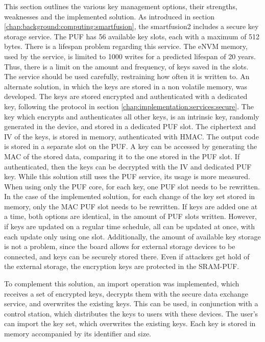 This section outlines the various key management options, their strengths, weaknesses and the implemented solution. 
As introduced in section \ref{chap:background:computing:smartfusion}, the smartfusion2 includes a secure key storage service. The PUF has 56 available key slots, each with a maximum of 512 bytes. There is a lifespan problem regarding this service. The eNVM memory, used by the service, is limited to 1000 writes for a predicted lifespan of 20 years. Thus, there is a limit on the amount and frequency, of keys saved in the slots. The service should be used carefully, restraining how often it is written to.
An alternate solution, in which the keys are stored in a non volatile memory, was developed. The keys are stored encrypted and authenticated with a dedicated key, following the protocol in section \ref{chap:implementation:services:secure}.
The key which encrypts and authenticates all other keys, is an intrinsic key, randomly generated in the device, and stored in a dedicated PUF slot. The ciphertext and IV of the keys, is stored in memory, authenticated with HMAC. The output code is stored in a separate slot on the PUF.
A key can be accessed by generating the MAC of the stored data, comparing it to the one stored in the PUF slot. If authenticated, then the keys can be decrypted with the IV and dedicated PUF key.
While this solution still uses the PUF service, its usage is more measured. When using only the PUF core, for each key, one PUF slot needs to be rewritten. In the case of the implemented solution, for each change of the key set stored in memory, only the MAC PUF slot needs to be rewritten. If keys are added one at a time, both options are identical, in the amount of PUF slots written. However, if keys are updated on a regular time schedule, all can be updated at once, with each update only using one slot. Additionally, the amount of available key storage is not a problem, since the board allows for external storage devices to be connected, and keys can be securely stored there. Even if attackers get hold of the external storage, the encryption keys are protected in the SRAM-PUF.

To complement this solution, an import operation was implemented, which receives a set of encrypted keys, decrypts them with the secure data exchange service, and overwrites the existing keys. This can be used, in conjunction with a control station, which distributes the keys to users with these devices. The user's can import the key set, which overwrites the existing keys.
Each key is stored in memory accompanied by its identifier and size.

